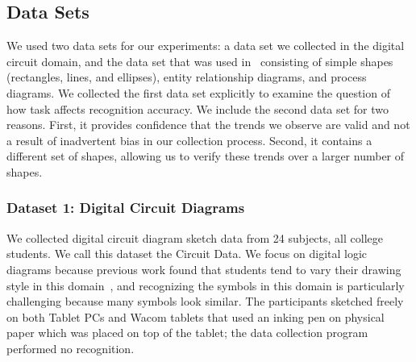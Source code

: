 \documentclass[final,5p,twocolumn]{elsarticle}
\begin{document}


\subsection{Data Sets}
\label{datasets}
We used two data sets for our experiments: a data set we collected
in the digital circuit domain, and the data set that was used in~\cite{schmieder09}
consisting of simple shapes (rectangles, lines, and ellipses), 
entity relationship diagrams, and process diagrams.  We collected
the first data set explicitly to examine the question of how 
task affects recognition accuracy.  We include the 
second data set for two reasons.  First, it provides 
confidence that the trends we observe are valid
and not a result of inadvertent bias in our collection process.  Second,
it contains a different set of shapes, allowing us to verify
these trends over a larger number of shapes.


\subsubsection{Dataset 1: Digital Circuit Diagrams}
We collected digital circuit diagram sketch data from 24 subjects, all
college students.  We call this dataset the Circuit Data.
We focus on digital logic diagrams because previous
work found that students tend to vary their drawing style in this
domain~\cite{alvarado07}, and recognizing the symbols in
this domain is particularly challenging because many symbols look
similar. The participants sketched freely on both Tablet PCs and Wacom 
tablets that used an inking pen on physical paper which was placed on top of 
the tablet; the data collection program performed no recognition.
\end{document}

